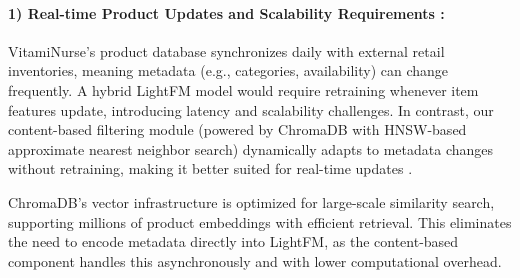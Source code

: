 \paragraph{1) Real-time Product Updates and Scalability Requirements :}
VitamiNurse's product database synchronizes daily with external retail inventories, meaning metadata (e.g., categories, availability) can change frequently. A hybrid LightFM model would require retraining whenever item features update, introducing latency and scalability challenges. In contrast, our content-based filtering module (powered by ChromaDB with HNSW-based approximate nearest neighbor search) dynamically adapts to metadata changes without retraining, making it better suited for real-time updates \cite{chromadb}.

ChromaDB's vector infrastructure is optimized for large-scale similarity search, supporting millions of product embeddings with efficient retrieval. This eliminates the need to encode metadata directly into LightFM, as the content-based component handles this asynchronously and with lower computational overhead.

